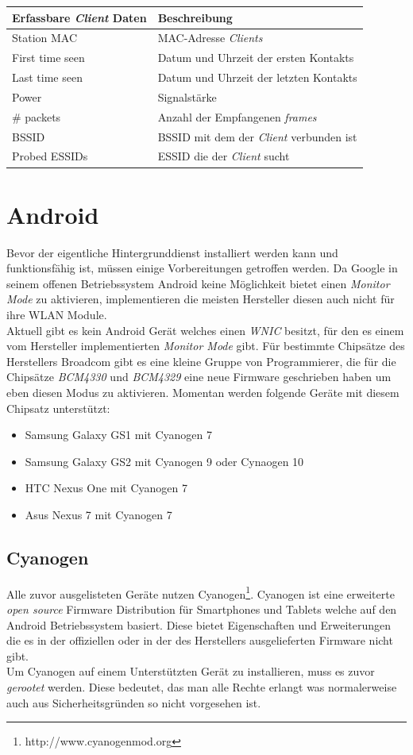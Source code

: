 \documentclass[]{report}
\begin{document}
\begin{tabular}{l | l}
\toprule
Erfassbare \textit{Client} Daten & Beschreibung \\
\midrule
Station MAC & MAC-Adresse \textit{Clients} \\
First time seen & Datum und Uhrzeit der ersten Kontakts \\
Last time seen & Datum und Uhrzeit der letzten Kontakts \\
Power & Signalstärke \\
\# packets & Anzahl der Empfangenen \textit{frames} \\
BSSID & BSSID mit dem der \textit{Client} verbunden ist \\
Probed ESSIDs & ESSID die der \textit{Client} sucht \\
\bottomrule
\end{tabular}
\section{Android}
Bevor der eigentliche Hintergrunddienst installiert werden kann und funktionsfähig ist, müssen einige Vorbereitungen getroffen werden. Da Google in seinem offenen Betriebssystem Android keine Möglichkeit bietet einen \textit{Monitor Mode} zu aktivieren, implementieren die meisten Hersteller diesen auch nicht für ihre WLAN Module.\\
Aktuell gibt es kein Android Gerät welches einen \textit{WNIC} besitzt, für den es einem vom Hersteller implementierten \textit{Monitor Mode} gibt. Für bestimmte Chipsätze des Herstellers Broadcom gibt es eine kleine Gruppe von Programmierer, die für die Chipsätze \textit{BCM4330} und \textit{BCM4329} eine neue Firmware geschrieben haben um eben diesen Modus zu aktivieren. Momentan werden folgende Geräte mit diesem Chipsatz unterstützt:
\begin{itemize}
\item Samsung Galaxy GS1 mit Cyanogen 7
\item Samsung Galaxy GS2 mit Cyanogen 9 oder Cynaogen 10
\item HTC Nexus One mit Cyanogen 7
\item Asus Nexus 7 mit Cyanogen 7
\end{itemize}
\subsection{Cyanogen}
Alle zuvor ausgelisteten Geräte nutzen Cyanogen\footnote{http://www.cyanogenmod.org}. Cyanogen ist eine erweiterte \textit{open source} Firmware Distribution für Smartphones und Tablets welche auf den Android Betriebssystem basiert. Diese bietet Eigenschaften und Erweiterungen die es in der offiziellen oder in der des Herstellers ausgelieferten Firmware nicht gibt. \\
Um Cyanogen auf einem Unterstützten Gerät zu installieren, muss es zuvor \textit{gerootet} werden. Diese bedeutet, das man alle Rechte erlangt was normalerweise auch aus Sicherheitsgründen so nicht vorgesehen ist. 
\end{document}
